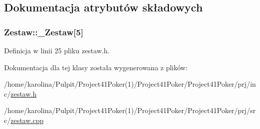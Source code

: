 \subsection{Dokumentacja atrybutów składowych}
\hypertarget{class_zestaw_a4d87ce909863a627e5322741b70a18f7}{
\subsubsection[{\-\_\-\-Zestaw}]{ Zestaw\-::\-\_\-\-Zestaw\mbox{[}5\mbox{]}}}\label{class_zestaw_a4d87ce909863a627e5322741b70a18f7}


Definicja w linii 25 pliku zestaw.\-h.



Dokumentacja dla tej klasy została wygenerowana z plików\-:\begin{DoxyCompactItemize}
\item 
/home/karolina/\-Pulpit/\-Project41\-Poker(1)/\-Project41\-Poker/\-Project41\-Poker/prj/inc/\hyperlink{zestaw_8h}{zestaw.\-h}\item 
/home/karolina/\-Pulpit/\-Project41\-Poker(1)/\-Project41\-Poker/\-Project41\-Poker/prj/src/\hyperlink{zestaw_8cpp}{zestaw.\-cpp}\end{DoxyCompactItemize}
